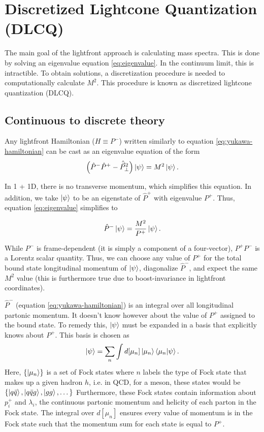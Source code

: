 \section{Discretized Lightcone Quantization (DLCQ)}
\label{sec:dlcq}

The main goal of the lightfront approach is calculating mass spectra. 
This is done by solving an eigenvalue equation \ref{eq:eigenvalue}.
In the continuum limit, this is intractible.
To obtain solutions, a discretization procedure is needed to computationally calculate $M^2$.
This procedure is known as discretized lightcone quantization (DLCQ).

\subsection{Continuous to discrete theory}
Any lightfront Hamiltonian ($H \equiv P^-$) written similarly to equation \ref{eq:yukawa-hamiltonian} can be cast as an eigenvalue equation of the form 
\begin{equation}
    \label{eq:eigenvalue}
    \left(\hat P^- \hat P^+ - \hat{\vec{P}}_\perp^2 \right)\ket{\psi} = M^2\ket{\psi}.
\end{equation}

In 1 + 1D, there is no transverse momentum, which simplifies this equation. 
In addition, we take $\ket{\psi}$ to be an eigenstate of $\hat P^+$ with eigenvalue $P^+$.
Thus, equation \ref{eq:eigenvalue} simplifies to 

\begin{equation}
    \label{eq:1p1Deigenvalue}
    \hat P^- \ket{\psi} = \frac{M^2}{P^+}\ket{\psi}.
\end{equation}

While $P^-$ is frame-dependent (it is simply a component of a four-vector), $P^+ P^-$ is a Lorentz scalar quantity. 
Thus, we can choose any value of $P^+$ for the total bound state longitudinal momentum of $\ket{\psi}$, diagonalize $\hat P^-$, and expect the same $M^2$ value (this is furthermore true due to boost-invariance in lightfront coordinates).

$\hat P^-$ (equation \ref{eq:yukawa-hamiltonian}) is an integral over all longitudinal partonic momentum. 
It doesn't know however about the value of $P^+$ assigned to the bound state. 
To remedy this, $\ket{\psi}$ must be expanded in a basis that explicitly knows about $P^+$.
This basis is chosen as $$\ket{\psi} = \sum_n \int d[\mu_n] \ket{\mu_n}\braket{\mu_n}{\psi}.$$
Here, $\{\ket{\mu_n} \}$ is a set of Fock states where $n$ labels the type of Fock state that makes up a given hadron $h$, i.e. in QCD, for a meson, these states would be $\{\ket{q\bar q}, \ket{q \bar qg}, \ket{gg}, \dots \}$
Furthermore, these Fock states contain information about $p_i^+$ and $\lambda_i$, the continuous partonic momentum and helicity of each parton in the Fock state. 
The integral over $d[\mu_n]$ ensures every value of momentum is in the Fock state such that the momentum sum for each state is equal to $P^+$.

